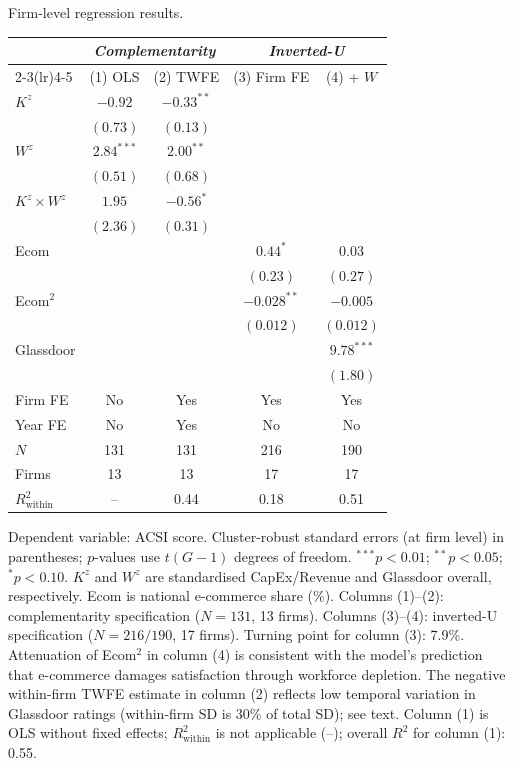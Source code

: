 \documentclass[msom,dblanonrev]{informs4}
\begin{document}
\begin{table}
\TABLE
{Firm-level regression results.\label{tab:reg_firm}}
{{\setlength{\tabcolsep}{4pt}\small
\begin{tabular}{@{}p{}cccc@{}}
\toprule
& \multicolumn{2}{c}{\textit{Complementarity}} & \multicolumn{2}{c}{\textit{Inverted-U}} \\
\cmidrule(lr){2-3}\cmidrule(lr){4-5}
& (1) OLS & (2) TWFE & (3) Firm FE & (4) + $W$ \\
\midrule
$K^z$ & $-0.92$ & $-0.33^{**}$ & & \\
 & $(0.73)$ & $(0.13)$ & & \\[2pt]
$W^z$ & $2.84^{***}$ & $2.00^{**}$ & & \\
 & $(0.51)$ & $(0.68)$ & & \\[2pt]
$K^z \times W^z$ & $1.95$ & $-0.56^{*}$ & & \\
 & $(2.36)$ & $(0.31)$ & & \\[2pt]
Ecom & & & $0.44^{*}$ & $0.03$ \\
 & & & $(0.23)$ & $(0.27)$ \\[2pt]
Ecom$^2$ & & & $-0.028^{**}$ & $-0.005$ \\
 & & & $(0.012)$ & $(0.012)$ \\[2pt]
Glassdoor & & & & $9.78^{***}$ \\
 & & & & $(1.80)$ \\
\midrule
Firm FE & No & Yes & Yes & Yes \\
Year FE & No & Yes & No & No \\
$N$ & 131 & 131 & 216 & 190 \\
Firms & 13 & 13 & 17 & 17 \\
$R^2_{\mathrm{within}}$ & -- & 0.44 & 0.18 & 0.51 \\
\bottomrule
\end{tabular}
}}{Dependent variable: ACSI score. Cluster-robust standard errors (at firm level) in parentheses; $p$-values use $t(G{-}1)$ degrees of freedom. $^{***}p < 0.01$; $^{**}p < 0.05$; $^{*}p < 0.10$. $K^z$ and $W^z$ are standardised CapEx/Revenue and Glassdoor overall, respectively. Ecom is national e-commerce share (\%). Columns (1)--(2): complementarity specification ($N{=}131$, 13 firms). Columns (3)--(4): inverted-U specification ($N{=}216/190$, 17 firms). Turning point for column (3): 7.9\%. Attenuation of Ecom$^2$ in column (4) is consistent with the model's prediction that e-commerce damages satisfaction through workforce depletion. The negative within-firm TWFE estimate in column (2) reflects low temporal variation in Glassdoor ratings (within-firm SD is 30\% of total SD); see text. Column (1) is OLS without fixed effects; $R^2_{\mathrm{within}}$ is not applicable (--); overall $R^2$ for column (1): 0.55.}\end{table}
\end{document}
